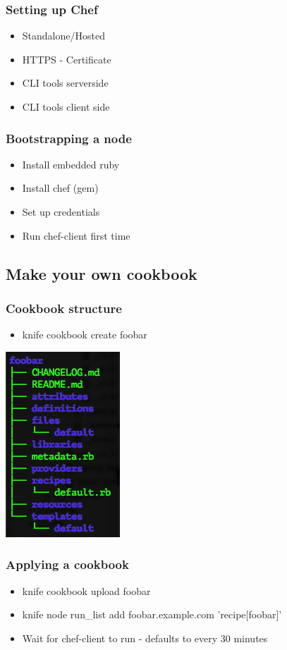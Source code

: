 \frame
{
  \frametitle{Setting up Chef}

  \begin{itemize}
  \item<1-> Standalone/Hosted
  \item<2-> HTTPS - Certificate
  \item<3-> CLI tools serverside
  \item<4-> CLI tools client side
  \end{itemize}
}

\frame
{
  \frametitle{Bootstrapping a node}

  \begin{itemize}
  \item<1-> Install embedded ruby
  \item<2-> Install chef (gem)
  \item<3-> Set up credentials
  \item<4-> Run chef-client first time
  \end{itemize}
}

\subsection{Make your own cookbook}
\frame
{
  \frametitle{Cookbook structure}

  \begin{itemize}
  \item knife cookbook create foobar
  \end{itemize}
  \begin{center}
  \includegraphics[scale=0.5]{images/cookbook_structure.png}
  \end{center}
}

\frame
{
  \frametitle{Applying a cookbook}

  \begin{itemize}
    \item knife cookbook upload foobar
    \item knife node run\_list add foobar.example.com 'recipe[foobar]'
    \item Wait for chef-client to run - defaults to every 30 minutes
  \end{itemize}
}

